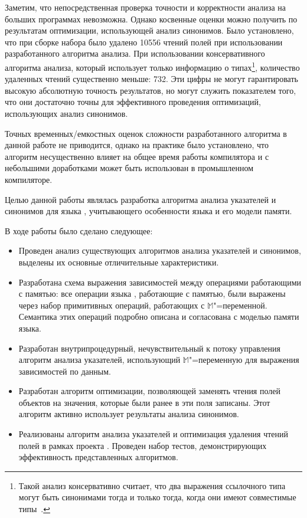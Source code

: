\documentclass[14pt,titlepage,draft]{extarticle}
\newcommand{\java}{\eng{Java}\xspace}
\newcommand{\M}{\ensuremath{\mathbb{M}}}
\begin{document}
    Заметим, что непосредственная проверка точности и корректности анализа на
    больших программах невозможна. Однако косвенные оценки можно получить по
    результатам оптимизации, использующей анализ синонимов. Было установлено,
    что при сборке набора  было удалено \num{10556} чтений
    полей при использовании разработанного алгоритма анализа. При использовании
    консервативного алгоритма анализа, который использует только информацию о
    типах\footnote{
      Такой анализ консервативно считает, что два выражения ссылочного типа
      могут быть синонимами тогда и только тогда, когда они имеют совместимые
      типы~\cite{diwan_tbaa}.
    },
    количество удаленных чтений существенно меньше: \num{732}.
    Эти цифры не могут гарантировать высокую абсолютную точность результатов,
    но могут служить показателем того, что они достаточно точны для
    эффективного проведения оптимизаций, использующих анализ синонимов.

    Точных временных\slash{}емкостных оценок сложности разработанного алгоритма в
    данной работе не приводится, однако на практике было установлено, что
    алгоритм несущественно влияет на общее время работы компилятора и с
    небольшими доработками может быть использован в промышленном компиляторе.


    Целью данной работы являлась разработка алгоритма анализа указателей и
    синонимов для языка \java, учитывающего особенности языка и его модели
    памяти.

    В ходе работы было сделано следующее:
    \begin{itemize}
      \item Проведен анализ существующих алгоритмов анализа указателей и
            синонимов, выделены их основные отличительные характеристики.
      \item Разработана схема выражения зависимостей между операциями
            работающими с памятью: все операции языка \java, работающие с
            памятью, были выражены через набор примитивных операций, работающих
            с \M"=переменной. Семантика этих операций подробно описана и
            согласована с моделью памяти языка.
      \item Разработан внутрипроцедурный, нечувствительный к потоку управления
            алгоритм анализа указателей, использующий \M"=переменную для
            выражения зависимостей по данным.
      \item Разработан алгоритм оптимизации, позволяющей заменять чтения полей
            объектов на значения, которые были ранее в эти поля записаны. Этот
            алгоритм активно использует результаты анализа синонимов.
      \item Реализованы алгоритм анализа указателей и оптимизация удаления
            чтений полей в рамках проекта . Проведен набор
            тестов, демонстрирующих эффективность представленных алгоритмов.
    \end{itemize}
\end{document}
